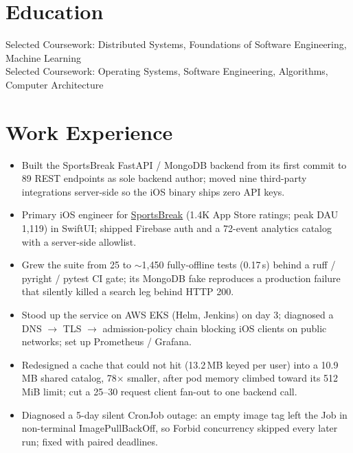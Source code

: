 \documentclass[11pt, letterpaper]{article}
\begin{document}

\section{Education}
Selected Coursework: Distributed Systems, Foundations of Software Engineering, Machine Learning\\[1pt]
Selected Coursework: Operating Systems, Software Engineering, Algorithms, Computer Architecture

\section{Work Experience}
\begin{itemize}
  \item Built the SportsBreak FastAPI / MongoDB backend from its first commit to 89 REST endpoints as sole backend author; moved nine third-party integrations server-side so the iOS binary ships zero API keys.
  \item Primary iOS engineer for \href{https://apps.apple.com/app/id6762649287}{SportsBreak} (1.4K App Store ratings; peak DAU 1{,}119) in SwiftUI; shipped Firebase auth and a 72-event analytics catalog with a server-side allowlist.
  \item Grew the suite from 25 to $\sim$1{,}450 fully-offline tests (0.17\,s) behind a ruff / pyright / pytest CI gate; its MongoDB fake reproduces a production failure that silently killed a search leg behind HTTP 200.
  \item Stood up the service on AWS EKS (Helm, Jenkins) on day 3; diagnosed a DNS $\to$ TLS $\to$ admission-policy chain blocking iOS clients on public networks; set up Prometheus / Grafana.
  \item Redesigned a cache that could not hit (13.2\,MB keyed per user) into a 10.9\,MB shared catalog, 78$\times$ smaller, after pod memory climbed toward its 512\,MiB limit; cut a 25--30 request client fan-out to one backend call.
  \item Diagnosed a 5-day silent CronJob outage: an empty image tag left the Job in non-terminal ImagePullBackOff, so Forbid concurrency skipped every later run; fixed with paired deadlines.
\end{itemize}
\end{document}
